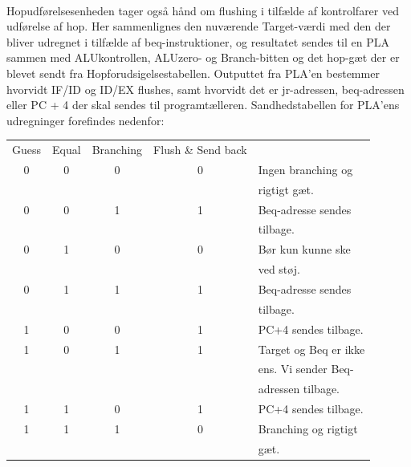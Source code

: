 \documentclass[10pt,a4paper,danish]{article}
\begin{document}
\paragraph{}
Hopudførelsesenheden tager også hånd om flushing i tilfælde af kontrolfarer
ved udførelse af hop. Her sammenlignes den nuværende Target-værdi med den
der bliver udregnet i tilfælde af beq-instruktioner, og resultatet
sendes til en PLA sammen med ALUkontrollen, ALUzero- og Branch-bitten og 
det hop-gæt der er blevet sendt fra Hopforudsigelsestabellen. Outputtet
fra PLA'en bestemmer hvorvidt IF/ID og ID/EX flushes, samt hvorvidt det er
jr-adressen, beq-adressen eller PC + 4 der skal sendes til programtælleren. 
Sandhedstabellen for PLA'ens udregninger forefindes nedenfor:

\begin{table}[!h]
    \hspace{1cm}
    \begin{tabular}{ccc|cl}
    Guess & Equal & Branching & Flush \& Send back & \\ \cline{1-4}
    0 & 0 & 0 & 0 & \color{gray}Ingen branching og \\
      &   &   &   & \color{gray}          rigtigt gæt.\\
    0 & 0 & 1 & 1 & \color{gray}Beq-adresse sendes \\
      &   &   &   & \color{gray}          tilbage.\\
    0 & 1 & 0 & 0 & \color{gray}Bør kun kunne ske \\
      &   &   &   & \color{gray}           ved støj.\\
    0 & 1 & 1 & 1 & \color{gray}Beq-adresse sendes \\
      &   &   &   & \color{gray}           tilbage.\\
    1 & 0 & 0 & 1 & \color{gray}PC+4 sendes tilbage.\\
    1 & 0 & 1 & 1 & \color{gray}Target og Beq er ikke\\
      &   &   &   & \color{gray}        ens. Vi sender Beq-\\
      &   &   &   & \color{gray}          adressen tilbage.\\
    1 & 1 & 0 & 1 & \color{gray}PC+4 sendes tilbage.\\
    1 & 1 & 1 & 0 & \color{gray}Branching og rigtigt\\
      &   &   &   & \color{gray}           gæt.\\
    \end{tabular}
\end{table} 
\end{document}
